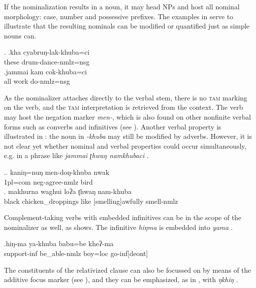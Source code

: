 	
If the nominalization results in a noun, it may head NPs and host all nominal morphology: case, number and possessive prefixes. The examples in \Next serve to illustrate that the resulting nominals can be modified or quantified just as simple nouns can. 

\ex. \ag.kha cyabruŋ-lak-khuba=ci\\
	these drum-dance{\sc -nmlz=nsg}	\\
	 
 	\bg.jammai kam cok-khuba=ci\\
	all work do{\sc -nmlz=nsg}\\
	 	

	
As the nominalizer attaches directly to the verbal stem, there is no \textsc{tam} marking on the verb, and the \textsc{tam} interpretation is retrieved from the context. The verb may host the negation marker \emph{men-}, which is also found on other nonfinite verbal forms such as converbs and infinitives (see \Next[a]). Another verbal property is illustrated in \Next: the noun in \emph{-khuba} may still be modified by adverbs. However, it is not clear yet whether nominal and verbal properties could occur simultaneously, e.g. in a phrase like \emph{jammai ʈhwaŋ namkhubaci} .
	
\ex.\ag. kaniŋ=nuŋ   men-doŋ-khuba     nwak\\
	{\sc 1pl=com} {\sc neg}-agree-{\sc nmlz} bird		\\ 
	 
\bg. makhurna waghui loʔa ʈhwaŋ nam-khuba\\
black chicken\_droppings like {[smelling]}awfully smell-{\sc nmlz}\\


Complement-taking verbs with embedded infinitives can be in the scope of the nominalizer as well, as \Next shows. The infinitive \emph{hiŋma}  is embedded into \emph{yama} .
	
	\exg.hiŋ-ma   ya-khuba babu=be    kheʔ-ma\\
	support{\sc -inf} be\_able{\sc -nmlz} boy{\sc =loc} go{\sc -inf[deont]}\\
	

The constituents of the relativized clause can also be focussed on by means of the additive focus marker (see \Next[a]), and  they can be emphasized, as in \Next[b], with \emph{ŋkhiŋ} .

